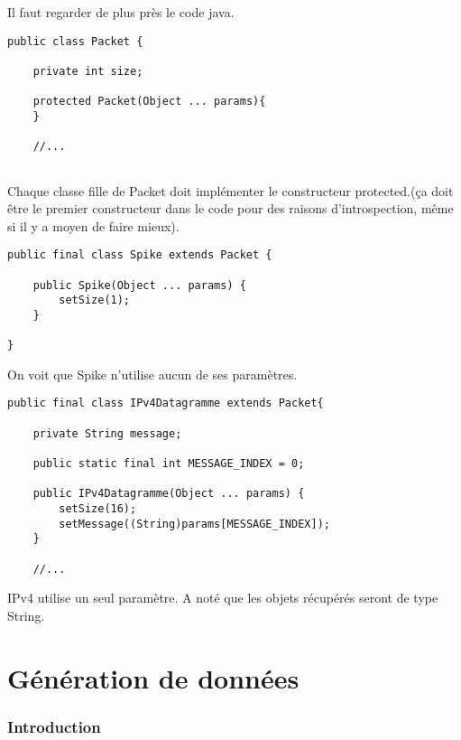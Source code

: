 \documentclass{report}
\begin{document}
Il faut regarder de plus près le code java.\\



\begin{verbatim}
public class Packet {

    private int size;    
  
    protected Packet(Object ... params){
    }
    
    //...
    
\end{verbatim}

Chaque classe fille de Packet doit implémenter le constructeur protected.(ça doit être le premier constructeur dans le code pour des raisons d'introspection, même si il y a moyen de faire mieux).\\

\begin{verbatim}
public final class Spike extends Packet {

    public Spike(Object ... params) {
        setSize(1);
    }

}
\end{verbatim}

On voit que Spike n'utilise aucun de ses paramètres.\\

\begin{verbatim}
public final class IPv4Datagramme extends Packet{
	
	private String message;
	
	public static final int MESSAGE_INDEX = 0;
	
	public IPv4Datagramme(Object ... params) {
        setSize(16); 
        setMessage((String)params[MESSAGE_INDEX]);
	}
	
	//...
\end{verbatim}

IPv4 utilise un seul paramètre. A noté que les objets récupérés seront de type String.\\


\part{Génération de données}

\section{Introduction}
\end{document}
